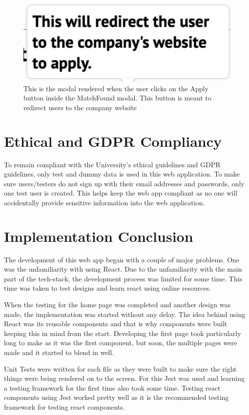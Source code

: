 \begin{figure}
    \centering
    \includegraphics[width=140mm]{Figures/Redirect.png}
    \caption{This is the modal rendered when the user clicks on the Apply button inside the MatchFound modal. This button is meant to redirect users to the company website}
    \label{fig:Redirect}
\end{figure}

\newpage
\section{Ethical and GDPR Compliancy}
To remain compliant with the University's ethical guidelines and GDPR guidelines, only test and dummy data is used in this web application. To make sure users/testers do not sign up with their email addresses and passwords, only one test user is created. This helps keep the web app compliant as no one will accidentally provide sensitive information into the web application.
\section{Implementation Conclusion}
The development of this web app began with a couple of major problems. One was the unfamiliarity with using React. Due to the unfamiliarity with the main part of the tech-stack, the development process was limited for some time. This time was taken to test designs and learn react using online resources. 

When the testing for the home page was completed and another design was made, the implementation was started without any delay. The idea behind using React was its reusable components and that is why components were built keeping this in mind from the start. Developing the first page took particularly long to make as it was the first component, but soon, the multiple pages were made and it started to blend in well. 

Unit Tests were written for each file as they were built to make sure the right things were being rendered on to the screen. For this Jest was used and learning a testing framework for the first time also took some time. Testing react components using Jest worked pretty well as it is the recommended testing framework for testing react components. 

